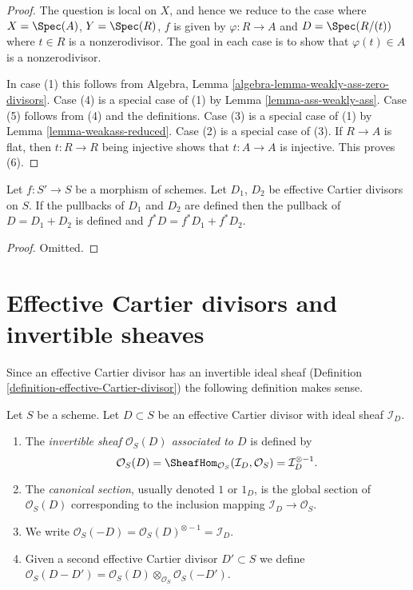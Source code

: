 \begin{proof}
The question is local on $X$, and hence we reduce to the case
where $X = \Spec(A)$, $Y = \Spec(R)$, $f$ is
given by $\varphi : R \to A$ and
$D = \Spec(R/(t))$ where $t \in R$ is a nonzerodivisor.
The goal in each case is to show that $\varphi(t) \in A$
is a nonzerodivisor.

\medskip\noindent
In case (1) this follows from
Algebra, Lemma \ref{algebra-lemma-weakly-ass-zero-divisors}.
Case (4) is a special case of (1) by Lemma \ref{lemma-ass-weakly-ass}.
Case (5) follows from (4) and the definitions.
Case (3) is a special case of (1) by
Lemma \ref{lemma-weakass-reduced}.
Case (2) is a special case of (3).
If $R \to A$ is flat, then $t : R \to R$ being injective
shows that $t : A \to A$ is injective. This proves (6).
\end{proof}

\begin{lemma}
\label{lemma-pullback-effective-Cartier-divisors-additive}
Let $f : S' \to S$ be a morphism of schemes.
Let $D_1$, $D_2$ be effective Cartier divisors on $S$.
If the pullbacks of $D_1$ and $D_2$ are defined then the
pullback of $D = D_1 + D_2$ is defined and
$f^*D = f^*D_1 + f^*D_2$.
\end{lemma}

\begin{proof}
Omitted.
\end{proof}





\section{Effective Cartier divisors and invertible sheaves}
\label{section-effective-Cartier-invertible}

\noindent
Since an effective Cartier divisor has an invertible ideal sheaf
(Definition \ref{definition-effective-Cartier-divisor}) the
following definition makes sense.

\begin{definition}
\label{definition-invertible-sheaf-effective-Cartier-divisor}
Let $S$ be a scheme. Let $D \subset S$ be an effective Cartier divisor
with ideal sheaf $\mathcal{I}_D$.
\begin{enumerate}
\item The {\it invertible sheaf $\mathcal{O}_S(D)$ associated to $D$}
is defined by
$$
\mathcal{O}_S(D) =
\SheafHom_{\mathcal{O}_S}(\mathcal{I}_D, \mathcal{O}_S) =
\mathcal{I}_D^{\otimes -1}.
$$
\item The {\it canonical section}, usually denoted $1$ or $1_D$, is the
global section of $\mathcal{O}_S(D)$ corresponding to
the inclusion mapping $\mathcal{I}_D \to \mathcal{O}_S$.
\item We write
$\mathcal{O}_S(-D) = \mathcal{O}_S(D)^{\otimes -1} = \mathcal{I}_D$.
\item Given a second effective Cartier divisor $D' \subset S$ we define
$\mathcal{O}_S(D - D') =
\mathcal{O}_S(D) \otimes_{\mathcal{O}_S} \mathcal{O}_S(-D')$.
\end{enumerate}
\end{definition}

